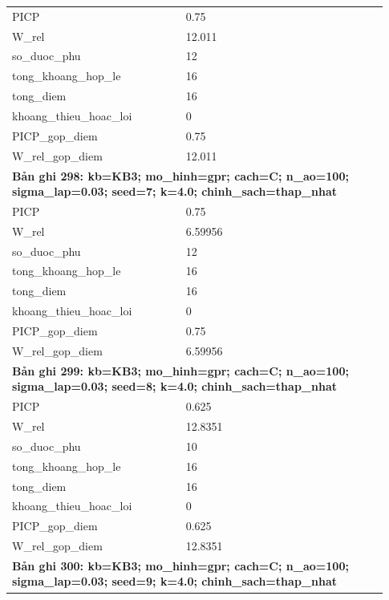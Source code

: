 \begin{longtable}{p{0.43\linewidth}p{0.50\linewidth}}
PICP & 0.75 \\
W\_\allowbreak rel & 12.011 \\
so\_\allowbreak duoc\_\allowbreak phu & 12 \\
tong\_\allowbreak khoang\_\allowbreak hop\_\allowbreak le & 16 \\
tong\_\allowbreak diem & 16 \\
khoang\_\allowbreak thieu\_\allowbreak hoac\_\allowbreak loi & 0 \\
PICP\_\allowbreak gop\_\allowbreak diem & 0.75 \\
W\_\allowbreak rel\_\allowbreak gop\_\allowbreak diem & 12.011 \\
\midrule
\multicolumn{2}{p{0.95\linewidth}}{\textbf{Bản ghi 298: kb=KB3; mo\_hinh=gpr; cach=C; n\_ao=100; sigma\_lap=0.03; seed=7; k=4.0; chinh\_sach=thap\_nhat}} \\
PICP & 0.75 \\
W\_\allowbreak rel & 6.59956 \\
so\_\allowbreak duoc\_\allowbreak phu & 12 \\
tong\_\allowbreak khoang\_\allowbreak hop\_\allowbreak le & 16 \\
tong\_\allowbreak diem & 16 \\
khoang\_\allowbreak thieu\_\allowbreak hoac\_\allowbreak loi & 0 \\
PICP\_\allowbreak gop\_\allowbreak diem & 0.75 \\
W\_\allowbreak rel\_\allowbreak gop\_\allowbreak diem & 6.59956 \\
\midrule
\multicolumn{2}{p{0.95\linewidth}}{\textbf{Bản ghi 299: kb=KB3; mo\_hinh=gpr; cach=C; n\_ao=100; sigma\_lap=0.03; seed=8; k=4.0; chinh\_sach=thap\_nhat}} \\
PICP & 0.625 \\
W\_\allowbreak rel & 12.8351 \\
so\_\allowbreak duoc\_\allowbreak phu & 10 \\
tong\_\allowbreak khoang\_\allowbreak hop\_\allowbreak le & 16 \\
tong\_\allowbreak diem & 16 \\
khoang\_\allowbreak thieu\_\allowbreak hoac\_\allowbreak loi & 0 \\
PICP\_\allowbreak gop\_\allowbreak diem & 0.625 \\
W\_\allowbreak rel\_\allowbreak gop\_\allowbreak diem & 12.8351 \\
\midrule
\multicolumn{2}{p{0.95\linewidth}}{\textbf{Bản ghi 300: kb=KB3; mo\_hinh=gpr; cach=C; n\_ao=100; sigma\_lap=0.03; seed=9; k=4.0; chinh\_sach=thap\_nhat}} \\

\end{longtable}
